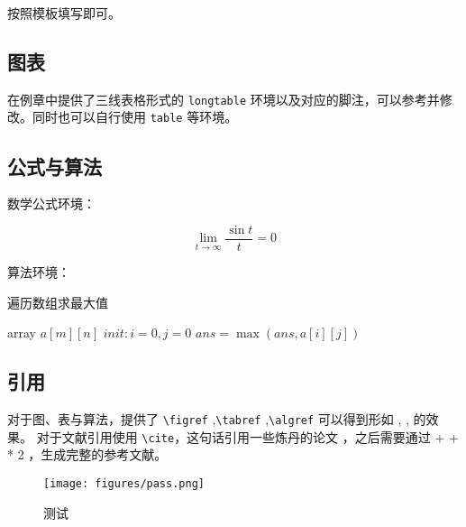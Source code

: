 \documentclass[lang=cn,12pt]{frbpaper}
\begin{document}
按照模板填写即可。

\subsection{图表}

在例章中提供了三线表格形式的 \lstinline{longtable} 环境以及对应的脚注，可以参考并修改。同时也可以自行使用 \lstinline{table} 等环境。

\subsection{公式与算法} 

数学公式环境：

\[\lim_{t \rightarrow \infty} \dfrac{\sin t}{t} = 0 \]

算法环境：

\begin{algorithm}
    \caption{遍历数组求最大值}
    \label{alg:array}
    \begin{algorithmic}
        \REQUIRE array \(a[m][n]\)
        \STATE \(init: i = 0, j = 0\)
        \REPEAT 
        \REPEAT
        \STATE \(ans = \max (ans, a[i][j])\)
    \end{algorithmic}
\end{algorithm}

\subsection{引用}

对于图、表与算法，提供了 \lstinline{\figref} ,\lstinline{\tabref} ,\lstinline{\algref} 可以得到形如 , ,  的效果。
对于文献引用使用 \lstinline{\cite}，这句话引用一些炼丹的论文 \cite{ghostnet,parashar2017scnn,park2017scale,abok}，之后需要通过  + +  * 2 ，生成完整的参考文献。


\begin{figure}[htb]\footnotesize
    \centering
    \texttt{[image: figures/pass.png]}
    \caption{测试}\label{fig:test}
    \label{fig:01}
\end{figure}
\end{document}
